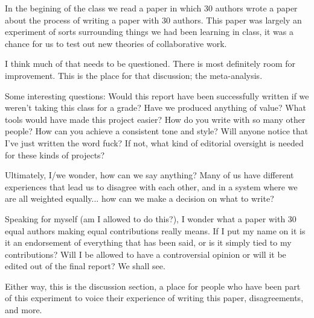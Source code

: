In the begining of the class we read a paper \cite{tomlinson2012} in which 30 authors wrote a paper
about the process of writing a paper with 30 authors. This paper was largely an experiment of sorts
surrounding things we had been learning in class, it was a chance for us to test out new theories 
of collaborative work.

I think much of that needs to be questioned. There is most definitely room for improvement. This
is the place for that discussion; the meta-analysis.

Some interesting questions:
Would this report have been successfully written if we weren't taking this class for a grade?
Have we produced anything of value?
What tools would have made this project easier? 
How do you write with so many other people? How can you achieve a consistent tone and style? 
Will anyone notice that I've just written the word fuck? If not, what kind of editorial oversight 
is needed for these kinds of projects?

Ultimately, I/we wonder, how can we say anything? Many of us have different experiences that lead 
us to disagree with each other, and in a system where we are all weighted equally... how can we make 
a decision on what to write?

Speaking for myself (am I allowed to do this?), I wonder what a paper with 30 equal authors making 
equal contributions really means. If I put my name on it is it an endorsement of everything that has 
been said, or is it simply tied to my contributions? Will I be allowed to have a controversial opinion 
or will it be edited out of the final report? We shall see.

Either way, this is the discussion section, a place for people who have been part of this experiment 
to voice their experience of writing this paper, disagreements, and more. 




